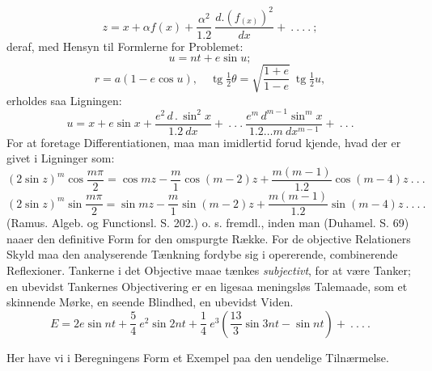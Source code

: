 \documentclass[12pt,a4paper]{book}
\renewcommand{\thefootnote}{*)}
\begin{document}
{%
\[
z = x + \alpha f (x) + \frac{\alpha^{2}}{1.2}\ \frac{d.(f_{(x)})^{2}}{dx}
+ \ .\ .\ .\ .\ ;
\]
deraf, med Hensyn til Formlerne for Problemet:
\[
u = nt + e \sin u;
\]
\[
r = a (1 - e \cos u), \quad \operatorname{tg} \tfrac{1}{2} \theta =
\sqrt{\frac{1 + e}{1 - e}}\ \operatorname{tg} \tfrac{1}{2} u,
\]
erholdes saa Ligningen:
\[
u = x + e \sin x + \frac{e^{2}\, d\, .\, \sin^{2} x}{1.2\ dx}
+ \ .\ .\ .\ \frac{e^{m}\, d^{m-1} \sin^{m} x}{1.2 \ldots m\ dx^{m-1}}
+ \ .\ .\ .
\]
For at foretage Differentiationen, maa man imidlertid forud kjende,
hvad der er givet i Ligninger som:
\[
(2 \sin z)^{m} \cos \frac{m \pi}{2} = \cos mz - \frac{m}{1} \cos (m-2) z
+ \frac{m (m-1)}{1.2} \cos (m-4) z \ .\ .\ .
\]
\[
(2 \sin z)^{m} \sin \frac{m \pi}{2} = \sin mz - \frac{m}{1} \sin (m-2) z
+ \frac{m (m-1)}{1.2} \sin (m-4) z \ .\ .\ .\ .
\]
(Ramus. Algeb. og Functionsl. S. 202.)
o. s. fremdl., inden man (Duhamel. S. 69) naaer den definitive Form for
den omspurgte Række. For de objective Relationers Skyld maa den
analyserende Tænkning fordybe sig i opererende, combinerende
Reflexioner. Tankerne i det Objective maae tænkes \emph{subjectivt}, for
at være Tanker; en ubevidst Tankernes Objectivering er en ligesaa
meningsløs Talemaade, som et skinnende Mørke, en seende Blindhed, en
ubevidst Viden.}%
\renewcommand{\thefootnote}{*)}
\[
E = 2e \sin nt + \frac{5}{4}\ e^{2} \sin 2nt + \frac{1}{4}\ e^{3}
\left( \frac{13}{3} \sin 3nt - \sin nt \right) + \ .\ .\ .\ .
\]

Her have vi i Beregningens Form et Exempel paa den uendelige
Tilnærmelse.
\end{document}
